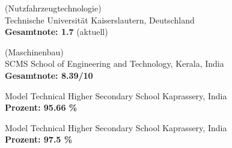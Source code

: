 (Nutzfahrzeugtechnologie)\\
Technische Universität Kaiserslautern, Deutschland\\
\textbf{Gesamtnote: 1.7} (aktuell)
\SmallSep

(Maschinenbau)\\
SCMS School of Engineering and Technology, Kerala, India\\
\textbf{Gesamtnote: 8.39/10}
\SmallSep

Model Technical Higher Secondary School Kaprassery, India\\
\textbf{Prozent: 95.66 \%}
\SmallSep

Model Technical Higher Secondary School Kaprassery, India\\
\textbf{Prozent: 97.5 \%}
\last